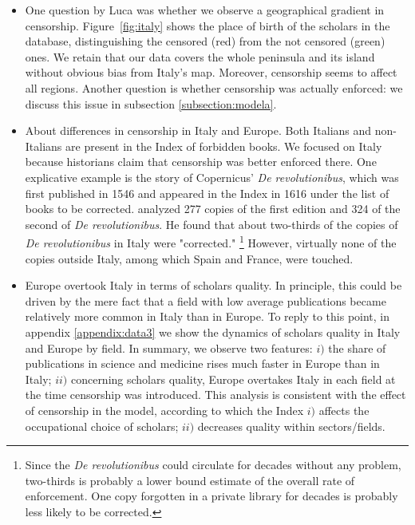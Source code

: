 \begin{itemize}
\item One question by Luca was whether we observe a geographical gradient in censorship. Figure~\ref{fig:italy} shows the place of birth of the scholars in the database, distinguishing the censored (red) from the not censored (green) ones. We retain that our data covers the whole peninsula and its island without obvious bias from Italy's map. Moreover, censorship seems to affect all regions. Another question is whether censorship was actually enforced: we discuss this issue in subsection \ref{subsection:modela}.

\item About differences in censorship in Italy and Europe. Both Italians and non-Italians are present in the Index of forbidden books. We focused on Italy because historians claim that censorship was better enforced there. One explicative example is the story of Copernicus’ \textit{De revolutionibus}, which was first published in 1546 and appeared in the Index in 1616 under the list of books to be corrected.  analyzed 277 copies of the first edition and 324 of the second of \textit{De revolutionibus}. He found that about two-thirds of the copies of \textit{De revolutionibus} in Italy were "corrected." \footnote{Since the \textit{De revolutionibus} could circulate for decades without any problem, two-thirds is probably a lower bound estimate of the overall rate of enforcement. One copy forgotten in a private library for decades is probably less likely to be corrected.} However, virtually none of the copies outside Italy, among which Spain and France, were touched. 

\item Europe overtook Italy in terms of scholars quality. In principle, this could be driven by the mere fact that a field with low average publications became relatively more common in Italy than in Europe. To reply to this point, in appendix \ref{appendix:data3} we show the dynamics of scholars quality in Italy and Europe by field. In summary, we observe two features: $i)$ the share of publications in science and medicine rises much faster in Europe than in Italy; $ii)$ concerning scholars quality, Europe overtakes Italy in each field at the time censorship was introduced. This analysis is consistent with the effect of censorship in the model, according to which the Index $i)$ affects the occupational choice of scholars; $ii)$ decreases quality within sectors/fields.


\end{itemize}
